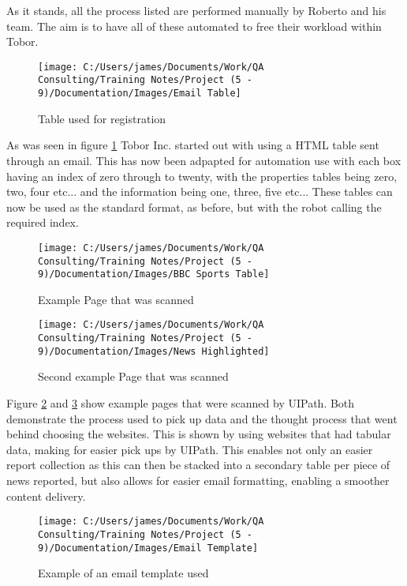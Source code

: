 \documentclass[12]{article}
\begin{document}
As it stands, all the process listed are performed manually by Roberto and his team. The aim is to have all of these automated to free their workload within Tobor.

\begin{figure}[H]
	\centering
	\texttt{[image: C:/Users/james/Documents/Work/QA Consulting/Training Notes/Project (5 - 9)/Documentation/Images/Email Table]}
	\caption{Table used for registration}
	\label{fig:RegistrationTable}
\end{figure}

As was seen in figure \ref{fig:RegistrationTable} Tobor Inc. started out with using a HTML table sent through an email. This has now been adpapted for automation use with each box having an index of zero through to twenty, with the properties tables being zero, two, four etc... and the information being one, three, five etc... These tables can now be used as the standard format, as before, but with the robot calling the required index.

\begin{figure}[H]
	\centering
	\texttt{[image: C:/Users/james/Documents/Work/QA Consulting/Training Notes/Project (5 - 9)/Documentation/Images/BBC Sports Table]}
	\caption{Example Page that was scanned}
	\label{fig:BBCSport}
\end{figure}

\begin{figure}[H]
	\centering
	\texttt{[image: C:/Users/james/Documents/Work/QA Consulting/Training Notes/Project (5 - 9)/Documentation/Images/News Highlighted]}
	\caption{Second example Page that was scanned}
	\label{fig:Scan}
\end{figure}

Figure \ref{fig:BBCSport} and \ref{fig:Scan} show example pages that were scanned by UIPath. Both demonstrate the process used to pick up data and the thought process that went behind choosing the websites. This is shown by using websites that had tabular data, making for easier pick ups by UIPath. This enables not only an easier report collection as this can then be stacked into a secondary table per piece of news reported, but also allows for easier email formatting, enabling a smoother content delivery.

\begin{figure}[H]
	\centering
	\texttt{[image: C:/Users/james/Documents/Work/QA Consulting/Training Notes/Project (5 - 9)/Documentation/Images/Email Template]}
	\caption{Example of an email template used}
	\label{fig:EmailTemplate}
\end{figure}
\end{document}
